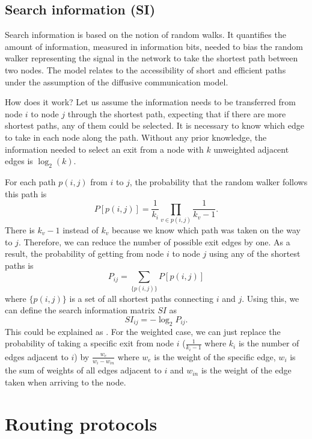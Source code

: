 \subsection{Search information (SI)}

Search information is based on the notion of random walks. It quantifies the amount of information, measured in information bits, needed to bias the random walker representing the signal in the network to take the shortest path between two nodes. The model relates to the accessibility of short and efficient paths under the assumption of the diffusive communication model. \cite{seguin_communication_2023,seguin_brain_2023}

How does it work? Let us assume the information needs to be transferred from node $i$ to node $j$ through the shortest path, expecting that if there are more shortest paths, any of them could be selected. It is necessary to know which edge to take in each node along the path. Without any prior knowledge, the information needed to select an exit from a node with $k$ unweighted adjacent edges is $\log_2(k)$. \cite{rosvall_searchability_2005,rosvall_networks_2005}

For each path $p(i,j)$ from $i$ to $j$, the probability that the random walker follows this path is 
$$
P[p(i,j)] = \frac{1}{k_i}\prod_{v \in p(i,j)}\frac{1}{k_v-1}.
$$
There is $k_v-1$ instead of $k_v$ because we know which path was taken on the way to $j$. Therefore, we can reduce the number of possible exit edges by one. As a result, the probability of getting from node $i$ to node $j$ using any of the shortest paths is 
$$
P_{ij} = \sum_{\{p(i,j)\}}P[p(i,j)] 
$$
where $\{p(i,j)\}$ is a set of all shortest paths connecting $i$ and $j$. Using this, we can define the search information matrix $SI$ as 
$$
SI_{ij}=-\log_2 P_{ij}.
$$
This could be explained as . For the weighted case, we can just replace the probability of taking a specific exit from node $i$ ($\frac{1}{k_i-1}$ where $k_i$ is the number of edges adjacent to $i$) by $\frac{w_e}{w_i-w_{in}}$ where $w_e$ is the weight of the specific edge, $w_i$ is the sum of weights of all edges adjacent to $i$ and $w_{in}$ is the weight of the edge taken when arriving to the node. 

\section{Routing protocols}

